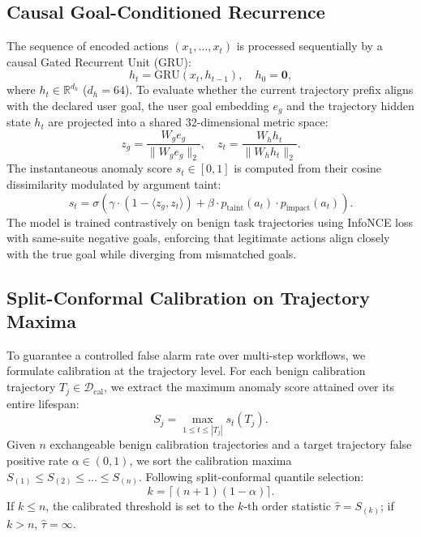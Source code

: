 \documentclass[11pt,a4paper]{article}
\begin{document}
\subsection{Causal Goal-Conditioned Recurrence}
The sequence of encoded actions $(x_1, \dots, x_t)$ is processed sequentially by a causal Gated Recurrent Unit (GRU):
\begin{equation}
    h_t = \text{GRU}(x_t, h_{t-1}), \quad h_0 = \mathbf{0},
\end{equation}
where $h_t \in \mathbb{R}^{d_h}$ ($d_h = 64$). To evaluate whether the current trajectory prefix aligns with the declared user goal, the user goal embedding $e_g$ and the trajectory hidden state $h_t$ are projected into a shared 32-dimensional metric space:
\begin{equation}
    z_g = \frac{W_g e_g}{\|W_g e_g\|_2}, \quad z_t = \frac{W_h h_t}{\|W_h h_t\|_2}.
\end{equation}
The instantaneous anomaly score $s_t \in [0, 1]$ is computed from their cosine dissimilarity modulated by argument taint:
\begin{equation}
    s_t = \sigma\left( \gamma \cdot (1 - \langle z_g, z_t \rangle) + \beta \cdot p_{\text{taint}}(a_t) \cdot p_{\text{impact}}(a_t) \right).
\end{equation}
The model is trained contrastively on benign task trajectories using InfoNCE loss with same-suite negative goals, enforcing that legitimate actions align closely with the true goal while diverging from mismatched goals.

\subsection{Split-Conformal Calibration on Trajectory Maxima}
To guarantee a controlled false alarm rate over multi-step workflows, we formulate calibration at the trajectory level. For each benign calibration trajectory $T_j \in \mathcal{D}_{\text{cal}}$, we extract the maximum anomaly score attained over its entire lifespan:
\begin{equation}
    S_j = \max_{1 \le t \le |T_j|} s_t(T_j).
\end{equation}
Given $n$ exchangeable benign calibration trajectories and a target trajectory false positive rate $\alpha \in (0, 1)$, we sort the calibration maxima $S_{(1)} \le S_{(2)} \le \dots \le S_{(n)}$. Following split-conformal quantile selection:
\begin{equation}
    k = \lceil (n + 1)(1 - \alpha) \rceil.
\end{equation}
If $k \le n$, the calibrated threshold is set to the $k$-th order statistic $\hat{\tau} = S_{(k)}$; if $k > n$, $\hat{\tau} = \infty$.
\end{document}

